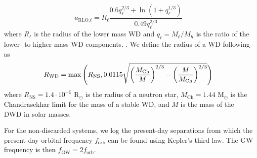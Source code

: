 \documentclass[twocolumn]{aastex631}
\begin{document}
\begin{equation}
    a_{\text{RLO,}\ell} = R_{\ell} \frac{0.6 q_{\ell}^{2/3} + \ln{(1+q_{\ell}^{1/3})}}{0.49 q_{\ell}^{2/3}}
\end{equation}
where $R_{\ell}$ is the radius of the lower mass WD and $q_{\ell} = M_{\ell}/M_{h}$ is the ratio of the lower- to higher-mass WD components. \citep{Eggleton1983}. 
We define the radius of a WD following \citet{Tout1997, Hurley2000} as
\begin{equation}
    R_{\rm{WD}} = \max\Bigg(R_\text{NS}, 0.0115\sqrt{\left(\frac{M_\text{Ch}}{M}\right)^{2/3}-\left(\frac{M}{M_\text{Ch}}\right)^{2/3}} \Bigg) 
\end{equation}
\noindent where $R_\text{NS} = 1.4\cdot 10^{-5}$ R$_\odot$ is the radius of a neutron star, $M_{\text{Ch}}=1.44$ M$_\odot$ is the Chandrasekhar limit for the mass of a stable WD, and $M$ is the mass of the DWD in solar masses. 

For the non-discarded systems, we log the present-day separations from which the present-day orbital frequency $f_\text{orb}$ can be found using Kepler's third law. The GW frequency is then $f_\text{GW} = 2f_\text{orb}$.

\end{document}
